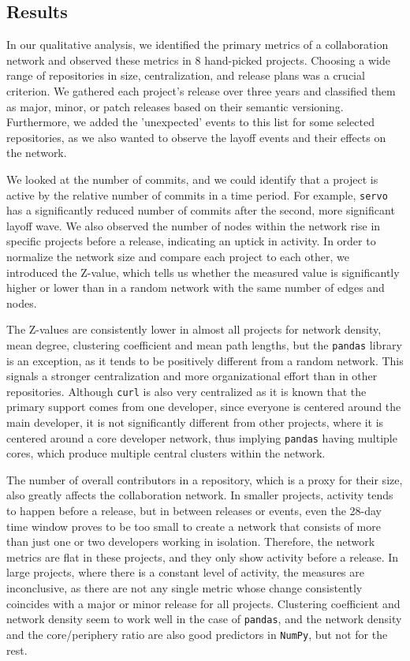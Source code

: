 \subsection{Results}

In our qualitative analysis, we identified the primary metrics of a collaboration network and observed these metrics in 8 hand-picked projects. Choosing a wide range of repositories in size, centralization, and release plans was a crucial criterion. We gathered each project's release over three years and classified them as major, minor, or patch releases based on their semantic versioning. Furthermore, we added the 'unexpected' events to this list for some selected repositories, as we also wanted to observe the layoff events and their effects on the network.

We looked at the number of commits, and we could identify that a project is active by the relative number of commits in a time period. For example, \texttt{servo} has a significantly reduced number of commits after the second, more significant layoff wave. We also observed the number of nodes within the network rise in specific projects before a release, indicating an uptick in activity. In order to normalize the network size and compare each project to each other, we introduced the Z-value, which tells us whether the measured value is significantly higher or lower than in a random network with the same number of edges and nodes.

The Z-values are consistently lower in almost all projects for network density, mean degree, clustering coefficient and mean path lengths, but the \texttt{pandas} library is an exception, as it tends to be positively different from a random network. This signals a stronger centralization and more organizational effort than in other repositories. Although \texttt{curl} is also very centralized as it is known that the primary support comes from one developer, since everyone is centered around the main developer, it is not significantly different from other projects, where it is centered around a core developer network, thus implying \texttt{pandas} having multiple cores, which produce multiple central clusters within the network.

The number of overall contributors in a repository, which is a proxy for their size, also greatly affects the collaboration network. In smaller projects, activity tends to happen before a release, but in between releases or events, even the 28-day time window proves to be too small to create a network that consists of more than just one or two developers working in isolation. Therefore, the network metrics are flat in these projects, and they only show activity before a release. In large projects, where there is a constant level of activity, the measures are inconclusive, as there are not any single metric whose change consistently coincides with a major or minor release for all projects. Clustering coefficient and network density seem to work well in the case of \texttt{pandas}, and the network density and the core/periphery ratio are also good predictors in \texttt{NumPy}, but not for the rest.

